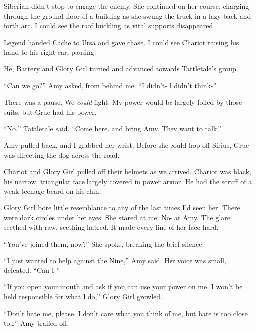 Siberian didn't stop to engage the enemy.  She continued on her course, charging through the ground floor of a building as she swung the truck in a lazy back and forth arc.  I could see the roof buckling as vital supports disappeared.



Legend handed Cache to Ursa and gave chase.  I could see Chariot raising his hand to his right ear, pausing.



He, Battery and Glory Girl turned and advanced towards Tattletale's group.



``Can we go?''  Amy asked, from behind me.  ``I didn't- I didn't think-''



There was a pause.  We \emph{could} fight.  My power would be largely foiled by those suits, but Grue had his power.



``No,'' Tattletale said.  ``Come here, and bring Amy.  They want to talk.''



Amy pulled back, and I grabbed her wrist.  Before she could hop off Sirius, Grue was directing the dog across the road.



Chariot and Glory Girl pulled off their helmets as we arrived.  Chariot was black, his narrow, triangular face largely covered in power armor.  He had the scruff of a weak teenage beard on his chin.



Glory Girl bore little resemblance to any of the last times I'd seen her.  There were dark circles under her eyes.  She stared at me.  No- at Amy.  The glare seethed with raw, seething hatred.  It made every line of her face hard.



``You've joined them, now?''  She spoke, breaking the brief silence.



``I just wanted to help against the Nine,'' Amy said.  Her voice was small, defeated.  ``Can I-''



``If you open your mouth and ask if you can use your power on me, I won't be held responsible for what I do,'' Glory Girl growled.



``Don't hate me, please.  I don't care what you think of me, but hate is too close to\ldots''  Amy trailed off.



